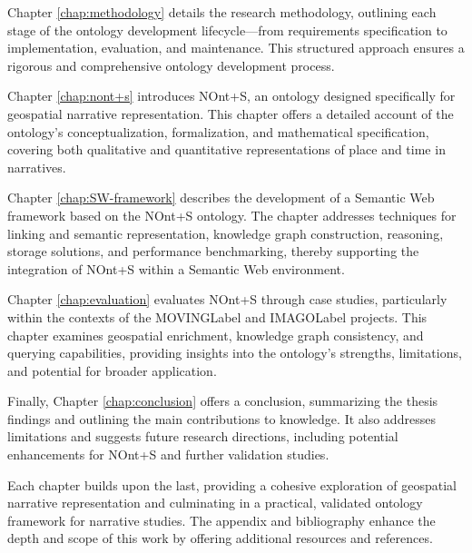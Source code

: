 Chapter \ref{chap:methodology} details the research methodology, outlining each stage of the ontology development lifecycle—from requirements specification to implementation, evaluation, and maintenance. This structured approach ensures a rigorous and comprehensive ontology development process.

Chapter \ref{chap:nont+s} introduces NOnt+S, an ontology designed specifically for geospatial narrative representation. This chapter offers a detailed account of the ontology's conceptualization, formalization, and mathematical specification, covering both qualitative and quantitative representations of place and time in narratives.

Chapter \ref{chap:SW-framework} describes the development of a Semantic Web framework based on the NOnt+S ontology. The chapter addresses techniques for linking and semantic representation, knowledge graph construction, reasoning, storage solutions, and performance benchmarking, thereby supporting the integration of NOnt+S within a Semantic Web environment.

Chapter \ref{chap:evaluation} evaluates NOnt+S through case studies, particularly within the contexts of the \acrfull{MOVINGLabel}\cite{MOVINGHorizon2020} and \acrfull{IMAGOLabel}\cite{IMAGOProject} projects. This chapter examines geospatial enrichment, knowledge graph consistency, and querying capabilities, providing insights into the ontology’s strengths, limitations, and potential for broader application.


Finally, Chapter \ref{chap:conclusion} offers a conclusion, summarizing the thesis findings and outlining the main contributions to knowledge. It also addresses limitations and suggests future research directions, including potential enhancements for NOnt+S and further validation studies.

Each chapter builds upon the last, providing a cohesive exploration of geospatial narrative representation and culminating in a practical, validated ontology framework for narrative studies. The appendix and bibliography enhance the depth and scope of this work by offering additional resources and references.
